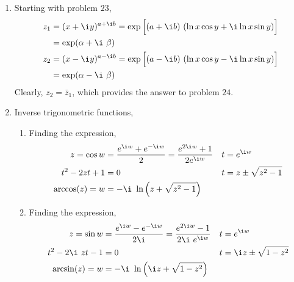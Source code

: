 \begin{enumerate}
    \item Starting with problem $ 23 $,
          \begin{align}
              z_1 & = (x + \i y)^{a + \i b} = \exp\Big[(a+\i b)
              \ (\ln x \cos y + \i \ln x\sin y) \Big]           \\
                  & = \exp(\alpha + \i\ \beta)                  \\
              z_2 & = (x - \i y)^{a - \i b} = \exp\Big[(a-\i b)
              \ (\ln x \cos y - \i \ln x\sin y) \Big]           \\
                  & = \exp(\alpha - \i\ \beta)
          \end{align}
          Clearly, $ z_2 = \bar{z}_1 $, which provides the answer to problem $ 24 $.

    \item Inverse trigonometric functions,
          \begin{enumerate}
              \item Finding the expression,
                    \begin{align}
                        z = \cos w     & = \frac{e^{\i w} + e^{-\i w}}{2}
                        = \frac{e^{2\i w} + 1}
                        {2e^{\i w}}    &
                        t              & = e^{\i w}                                 \\
                        t^2 - 2zt + 1  & = 0                                      &
                        t              & = z \pm \sqrt{z^2 - 1}                     \\
                        \arccos(z) = w & = -\i\ \ln\Big( z + \sqrt{z^2 - 1} \Big)
                    \end{align}
              \item Finding the expression,
                    \begin{align}
                        z = \sin w        & = \frac{e^{\i w} - e^{-\i w}}{2\i}
                        = \frac{e^{2\i w} - 1}
                        {2\i\ e^{\i w}}   &
                        t                 & = e^{\i w}                              \\
                        t^2 - 2\i\ zt - 1 & = 0                                   &
                        t                 & = \i z \pm \sqrt{1 - z^2}               \\
                        \arcsin(z) = w    & = -\i\ \ln\Big( \i z + \sqrt{1 - z^2}
                        \Big)
                    \end{align}

\end{enumerate}
\end{enumerate}
